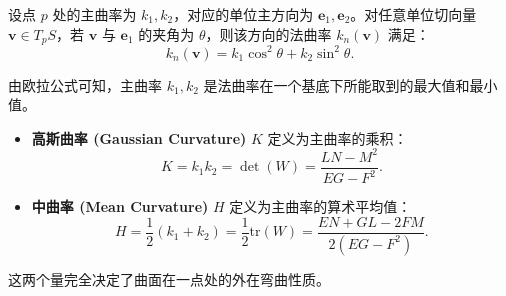 \documentclass[lang=cn,10pt,thmcnt=section]{elegantbook}
\renewcommand{\vec}[1]{\mathbf{#1}}
\begin{document}
\begin{proposition}\label{prop:euler}
    设点 $p$ 处的主曲率为 $k_1, k_2$，对应的单位主方向为 $\vec{e}_1, \vec{e}_2$。对任意单位切向量 $\vec{v} \in T_pS$，若 $\vec{v}$ 与 $\vec{e}_1$ 的夹角为 $\theta$，则该方向的法曲率 $k_n(\vec{v})$ 满足：
    \[
    k_n(\vec{v}) = k_1 \cos^2 \theta + k_2 \sin^2 \theta.
    \]
\end{proposition}
\begin{remark}
    由欧拉公式可知，主曲率 $k_1, k_2$ 是法曲率在一个基底下所能取到的最大值和最小值。
\end{remark}
\begin{definition}[高斯曲率与中曲率]
    \begin{itemize}
        \item \textbf{高斯曲率 (Gaussian Curvature)} $K$ 定义为主曲率的乘积：
        \[
        K = k_1 k_2 = \det(W) = \frac{LN - M^2}{EG - F^2}.
        \]
        \item \textbf{中曲率 (Mean Curvature)} $H$ 定义为主曲率的算术平均值：
        \[
        H = \frac{1}{2}(k_1 + k_2) = \frac{1}{2}\text{tr}(W) = \frac{EN + GL - 2FM}{2(EG - F^2)}.
        \]
    \end{itemize}
    这两个量完全决定了曲面在一点处的外在弯曲性质。
\end{definition}
\end{document}
